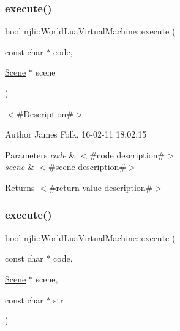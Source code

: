 \subsubsection{\texorpdfstring{execute()}{execute()}\hspace{0.1cm}{\footnotesize\ttfamily [6/33]}}
{\footnotesize\ttfamily bool njli\+::\+World\+Lua\+Virtual\+Machine\+::execute (\begin{DoxyParamCaption}\item[{const char $\ast$}]{code,  }\item[{\mbox{\hyperlink{classnjli_1_1_scene}{Scene}} $\ast$}]{scene }\end{DoxyParamCaption})}



$<$\#\+Description\#$>$ 

\begin{DoxyAuthor}{Author}
James Folk, 16-\/02-\/11 18\+:02\+:15
\end{DoxyAuthor}

\begin{DoxyParams}{Parameters}
{\em code} & $<$\#code description\#$>$ \\
\hline
{\em scene} & $<$\#scene description\#$>$\\
\hline
\end{DoxyParams}
\begin{DoxyReturn}{Returns}
$<$\#return value description\#$>$ 
\end{DoxyReturn}
\mbox{\label{classnjli_1_1_world_lua_virtual_machine_af9efd06a3f45642e82f7f5089518a4d1}} 
\subsubsection{\texorpdfstring{execute()}{execute()}\hspace{0.1cm}{\footnotesize\ttfamily [7/33]}}
{\footnotesize\ttfamily bool njli\+::\+World\+Lua\+Virtual\+Machine\+::execute (\begin{DoxyParamCaption}\item[{const char $\ast$}]{code,  }\item[{\mbox{\hyperlink{classnjli_1_1_scene}{Scene}} $\ast$}]{scene,  }\item[{const char $\ast$}]{str }\end{DoxyParamCaption})}

